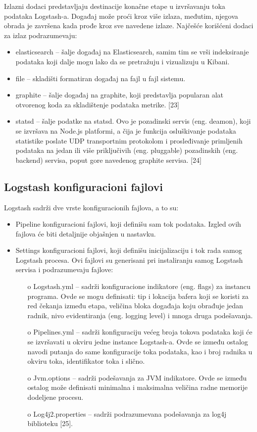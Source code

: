 \par
Izlazni dodaci predstavljaju destinacije konačne etape u izvršavanju toka podataka Logstash-a. Događaj može proći kroz više izlaza, međutim, njegova obrada je završena kada prođe kroz sve navedene izlaze. Najčešće korišćeni dodaci za izlaz podrazumevaju:
\begin{itemize}
\item elasticsearch – šalje događaj na Elasticsearch, samim tim se vrši indeksiranje podataka koji dalje mogu lako da se pretražuju i vizualizuju u Kibani.
\item file – skladišti formatiran događaj na fajl u fajl sistemu.
\item graphite – šalje događaj na graphite, koji predstavlja popularan alat otvorenog koda za skladištenje podataka metrike. [23]
\item statsd – šalje podatke na statsd. Ovo je pozadinski servis (eng. deamon), koji se izvršava na Node.js platformi, a čija je funkcija osluškivanje podataka statistike poslate UDP transportnim protokolom i prosleđivanje primljenih podataka na jedan ili više priključivih (eng. pluggable) pozadinskih (eng. backend) servisa, poput gore navedenog graphite servisa. [24]
\end{itemize}

\subsection{Logstash konfiguracioni fajlovi}
Logstash sadrži dve vrste konfiguracionih fajlova, a to su:
\begin{itemize}
    \item Pipeline konfiguracioni fajlovi, koji definišu sam tok podataka. Izgled ovih fajlova će biti detaljnije objašnjen u nastavku.
    \item Settings konfiguracioni fajlovi, koji definišu inicijalizaciju i tok rada samog Logstash procesa. Ovi fajlovi su generisani pri instaliranju samog Logstash servisa i podrazumevaju fajlove:
    \begin{itemize}
        \item[o] Logstash.yml – sadrži konfiguracione indikatore (eng. flags) za instancu programa. Ovde se mogu definisati: tip i lokacija bafera koji se koristi za red čekanja između etapa, veličina bloka događaja koju obrađuje jedan radnik, nivo evidentiranja (eng. logging level) i mnoga druga podešavanja.
        \item[o] Pipelines.yml – sadrži konfiguraciju većeg broja tokova podataka koji će se izvršavati u okviru jedne instance Logstash-a. Ovde se između ostalog navodi putanja do same konfiguracije toka podataka, kao i broj radnika u okviru toka, identifikator toka i slično.
        \item[o] Jvm.options – sadrži podešavanja za JVM indikatore. Ovde se između ostalog može definisati minimalna i maksimalna veličina radne memorije dodeljene procesu.
        \item[o] Log4j2.properties – sadrži podrazumevana podešavanja za log4j biblioteku [25].
    \end{itemize}
\end{itemize}

